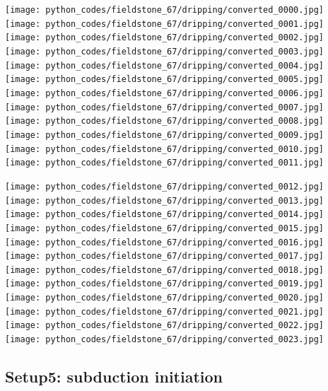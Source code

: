 \begin{center}
\texttt{[image: python\_codes/fieldstone\_67/dripping/converted\_0000.jpg]}
\texttt{[image: python\_codes/fieldstone\_67/dripping/converted\_0001.jpg]}
\texttt{[image: python\_codes/fieldstone\_67/dripping/converted\_0002.jpg]}
\texttt{[image: python\_codes/fieldstone\_67/dripping/converted\_0003.jpg]}\\
\texttt{[image: python\_codes/fieldstone\_67/dripping/converted\_0004.jpg]}
\texttt{[image: python\_codes/fieldstone\_67/dripping/converted\_0005.jpg]}
\texttt{[image: python\_codes/fieldstone\_67/dripping/converted\_0006.jpg]}
\texttt{[image: python\_codes/fieldstone\_67/dripping/converted\_0007.jpg]}\\
\texttt{[image: python\_codes/fieldstone\_67/dripping/converted\_0008.jpg]}
\texttt{[image: python\_codes/fieldstone\_67/dripping/converted\_0009.jpg]}
\texttt{[image: python\_codes/fieldstone\_67/dripping/converted\_0010.jpg]}
\texttt{[image: python\_codes/fieldstone\_67/dripping/converted\_0011.jpg]}
\end{center}


\begin{center}
\texttt{[image: python\_codes/fieldstone\_67/dripping/converted\_0012.jpg]}
\texttt{[image: python\_codes/fieldstone\_67/dripping/converted\_0013.jpg]}
\texttt{[image: python\_codes/fieldstone\_67/dripping/converted\_0014.jpg]}
\texttt{[image: python\_codes/fieldstone\_67/dripping/converted\_0015.jpg]}\\
\texttt{[image: python\_codes/fieldstone\_67/dripping/converted\_0016.jpg]}
\texttt{[image: python\_codes/fieldstone\_67/dripping/converted\_0017.jpg]}
\texttt{[image: python\_codes/fieldstone\_67/dripping/converted\_0018.jpg]}
\texttt{[image: python\_codes/fieldstone\_67/dripping/converted\_0019.jpg]}\\
\texttt{[image: python\_codes/fieldstone\_67/dripping/converted\_0020.jpg]}
\texttt{[image: python\_codes/fieldstone\_67/dripping/converted\_0021.jpg]}
\texttt{[image: python\_codes/fieldstone\_67/dripping/converted\_0022.jpg]}
\texttt{[image: python\_codes/fieldstone\_67/dripping/converted\_0023.jpg]}
\end{center}



\newpage
\subsection*{Setup5: subduction initiation}

